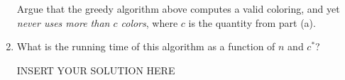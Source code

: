 \begin{enumerate}
Argue that the greedy algorithm above computes a valid coloring, and yet {\em never uses more than $c$ colors}, where $c$ is the quantity from part (a).%
\begin{solution}

\end{solution}
\item What is the running time of this algorithm as a function of $n$ and $c^*$?
\begin{solution}   INSERT YOUR SOLUTION HERE   \end{solution}


\end{enumerate}